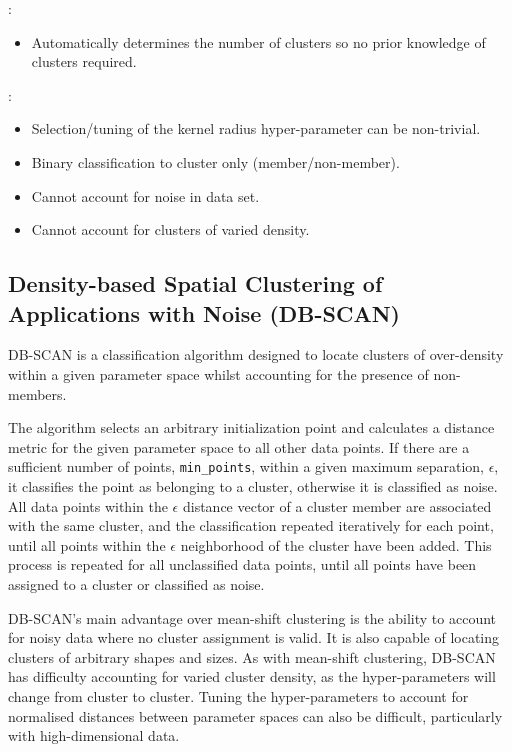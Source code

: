 \vspace{10pt}

: 
\begin{itemize}
    \item Automatically determines the number of clusters so no prior knowledge of clusters required.
\end{itemize} 

: 
\begin{itemize}
    \item Selection/tuning of the kernel radius hyper-parameter can be non-trivial.
    \item Binary classification to cluster only (member/non-member).
    \item Cannot account for noise in data set.
    \item Cannot account for clusters of varied density.

\end{itemize}

\subsection{Density-based Spatial Clustering of Applications with Noise (DB-SCAN)}

DB-SCAN is a classification algorithm designed to locate clusters of over-density within a given parameter space whilst accounting for the presence of non-members. 

The algorithm selects an arbitrary initialization point and calculates a distance metric for the given parameter space to all other data points. If there are a sufficient number of points, \texttt{min\_points}, within a given maximum separation, $\epsilon$, it classifies the point as belonging to a cluster, otherwise it is classified as noise. All data points within the $\epsilon$ distance vector of a cluster member are associated with the same cluster, and the classification repeated iteratively for each point, until all points within the $\epsilon$ neighborhood of the cluster have been added. This process is repeated for all unclassified data points, until all points have been assigned to a cluster or classified as noise.

DB-SCAN's main advantage over mean-shift clustering is the ability to account for noisy data where no cluster assignment is valid. It is also capable of locating clusters of arbitrary shapes and sizes. As with mean-shift clustering, DB-SCAN has difficulty accounting for varied cluster density, as the hyper-parameters will change from cluster to cluster. Tuning the hyper-parameters to account for normalised distances between parameter spaces can also be difficult, particularly with high-dimensional data.

